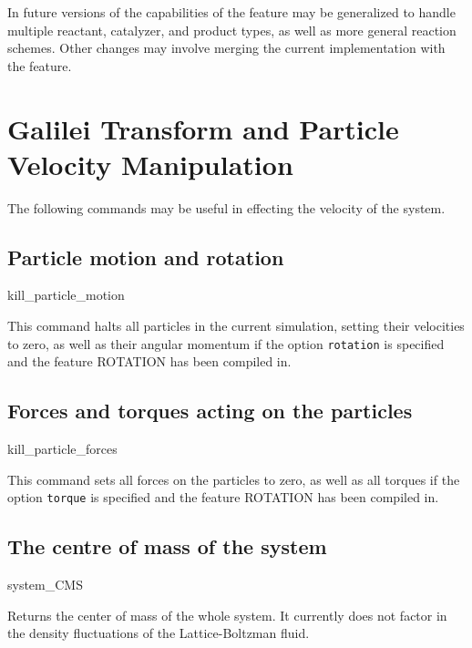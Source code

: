 In future versions of \es the capabilities of the
 feature may be generalized to handle
multiple reactant, catalyzer, and product types, as well as more
general reaction schemes. Other changes may involve merging the
current implementation with the  feature.

\section{Galilei Transform and Particle Velocity Manipulation}
\label{sec:Galilei}

The following commands may be useful in effecting the velocity of the
system.

\subsection{Particle motion and rotation}

\begin{essyntax}
  kill_particle_motion 
  \begin{features}
  \end{features}
\end{essyntax}
This command halts all particles in the current simulation, setting
their velocities to zero, as well as their angular momentum if the
option \texttt{rotation} is specified and the feature ROTATION has
been compiled in.

\subsection{Forces and torques acting on the particles}

\begin{essyntax}
  kill_particle_forces 
  \begin{features}
  \end{features}
\end{essyntax}
This command sets all forces on the particles to zero, as well as all
torques if the option \texttt{torque} is specified and the feature
ROTATION has been compiled in. 

\subsection{The centre of mass of the system}

\begin{essyntax}
  system_CMS
\end{essyntax}
Returns the center of mass of the whole system. It currently does not
factor in the density fluctuations of the Lattice-Boltzman fluid.

